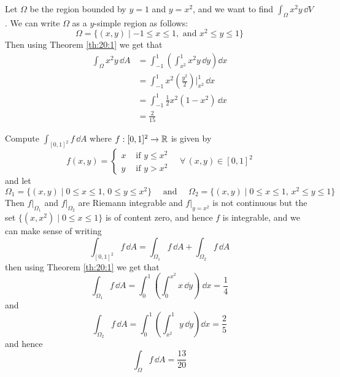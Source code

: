 \documentclass[../Analysis-3.tex]{subfiles}
\begin{document}
\begin{Eg}{}{}
  Let $\Omega$ be the region bounded by $y = 1$ and $y = x^2$, and we want to find $\int_{\Omega} x^2y \, \dd V$. We can write $\Omega$ as a $y$-simple region as follows:
  \[
    \Omega = \{ (x,y) \mid -1 \leq x \leq 1, \mbox{ and } x^2 \leq y \leq 1 \}
  \]
  Then using Theorem \ref{th:20:1} we get that
  \begin{align*}
    \int_{\Omega} x^2y \, \dd A
     & = \int_{-1}^1 \left( \int_{x^2}^1 x^2y \, \dd y\right)\dd x               \\
     & = \int_{-1}^1 x^2 \left( \frac{y^2}{2} \right)\bigg\vert_{x^2}^1 \, \dd x \\
     & = \int_{-1}^1 \frac{1}{2} x^2(1-x^2) \, \dd x                             \\
     & = \frac{2}{15}
  \end{align*}
\end{Eg}

\begin{Eg}{}{}
  Compute $\int_{[0,1]^2} f \, \dd A$ where $f : [0,1]^2 \to \mathbb{R}$ is given by
  \[
    f(x,y) = \begin{cases}
      x & \mbox{ if } y \leq x^2 \\ y & \mbox{ if } y > x^2
    \end{cases} \quad \forall \, (x,y) \in [0,1]^2
  \]
  and let
  \[
    \Omega_1 = \{ (x,y) \mid 0 \leq x \leq 1, \, 0 \leq y \leq x^2 \} \quad \mbox{ and } \quad \Omega_2 = \{ (x,y) \mid 0 \leq x \leq 1, \, x^2 \leq y \leq 1 \}
  \]
  Then $f\vert_{\Omega_1}$ and $f\vert_{\Omega_2}$ are Riemann integrable and $f\vert_{y=x^2}$ is not continuous but the set $\{ (x,x^2) \mid 0 \leq x \leq 1 \}$ is of content zero, and hence $f$ is integrable, and we can make sense of writing
  \[
    \int_{[0,1]^2} f \, \dd A = \int_{\Omega_1} f \, \dd A + \int_{\Omega_2} f \, \dd A
  \]
  then using Theorem \ref{th:20:1} we get that
  \[
    \int_{\Omega_1} f \, \dd A = \int_0^1 \left( \int_0^{x^2} x \, \dd y \right)\ \dd x = \frac{1}{4}
  \]
  and
  \[
    \int_{\Omega_2} f \, \dd A = \int_0^1 \left( \int_{x^2}^1 y \, \dd y\right)\dd x = \frac{2}{5}
  \]
  and hence
  \[
    \int_{\Omega} f \, \dd A = \frac{13}{20}
  \]
\end{Eg}
\end{document}
